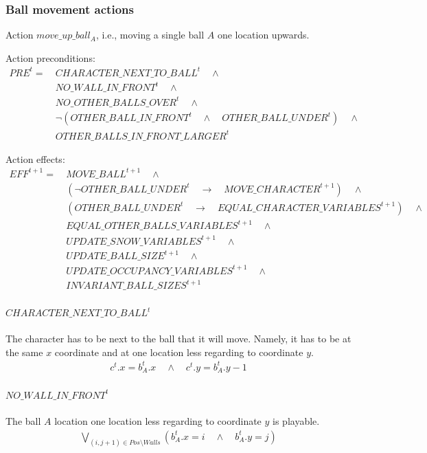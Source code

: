 \documentclass{report}
\theoremstyle{plain}
\begin{document}
\subsubsection{Ball movement actions}
Action $move\_up\_ball_A$, i.e., moving a single ball $A$ one location upwards.

Action preconditions:
\begin{align*}
PRE^t = \ & CHARACTER\_NEXT\_TO\_BALL^t \quad \wedge \\
& NO\_WALL\_IN\_FRONT^t \quad \wedge \\
& NO\_OTHER\_BALLS\_OVER^t \quad \wedge \\
& \lnot (OTHER\_BALL\_IN\_FRONT^t \quad \wedge \quad OTHER\_BALL\_UNDER^t) \quad \wedge \\
& OTHER\_BALLS\_IN\_FRONT\_LARGER^t
\end{align*}

Action effects:
\begin{align*}
EFF^{t+1} = \ & MOVE\_BALL^{t+1} \quad \wedge \\
& (\lnot OTHER\_BALL\_UNDER^t \quad \rightarrow \quad MOVE\_CHARACTER^{t+1}) \quad \wedge \\
& (OTHER\_BALL\_UNDER^t  \quad \rightarrow \quad EQUAL\_CHARACTER\_VARIABLES^{t+1}) \quad \wedge \\
& EQUAL\_OTHER\_BALLS\_VARIABLES^{t+1} \quad \wedge \\
& UPDATE\_SNOW\_VARIABLES^{t+1} \quad \wedge \\
& UPDATE\_BALL\_SIZE^{t+1} \quad \wedge \\
& UPDATE\_OCCUPANCY\_VARIABLES^{t+1} \quad \wedge \\
& INVARIANT\_BALL\_SIZES^{t+1}
\end{align*}

\paragraph{$CHARACTER\_NEXT\_TO\_BALL^t$} 
The character has to be next to the ball that it will move. Namely, it has to be at the same $x$ coordinate and at one location less regarding to coordinate $y$.
\begin{align*}
c^t.x = b_A^t.x \quad \wedge \quad c^t.y = b_A^t.y - 1
\end{align*}  

\paragraph{$NO\_WALL\_IN\_FRONT^t$}
The ball $A$ location one location less regarding to coordinate $y$ is playable.
\begin{align*}
\bigvee \limits_{(i, j + 1) \in Pos \setminus Walls}  (b_A^t.x = i \quad \wedge \quad b_A^t.y = j)
\end{align*}
\end{document}
